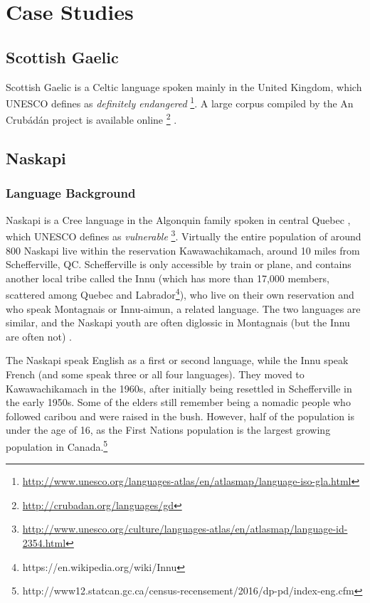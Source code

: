 \section{Case Studies}\label{sec:case-studies}
\subsection{Scottish Gaelic}

Scottish Gaelic is a Celtic language spoken mainly in the United Kingdom, which UNESCO defines as {\it definitely endangered} \footnote{\href{http://www.unesco.org/languages-atlas/en/atlasmap/language-iso-gla.html}{http://www.unesco.org/languages-atlas/en/atlasmap/language-iso-gla.html}}. A large corpus compiled by the An Crub\'ad\'an project is available online \footnote{\href{http://crubadan.org/languages/gd}{http://crubadan.org/languages/gd}} \cite{scannell2007crubadan}.

\subsection{Naskapi}

\subsubsection{Language Background}

Naskapi is a Cree language in the Algonquin family spoken in central Quebec \cite{MacKenzie-and-Jancewicz-1994}, which UNESCO defines as {\it vulnerable} \footnote{\href{http://www.unesco.org/culture/languages-atlas/en/atlasmap/language-id-2354.html}{http://www.unesco.org/culture/languages-atlas/en/atlasmap/language-id-2354.html}}. Virtually the entire population of around 800 Naskapi live within the reservation Kawawachikamach, around 10 miles from Schefferville, QC. Schefferville is only accessible by train or plane, and contains another local tribe called the Innu (which has more than 17,000 members, scattered among Quebec and Labrador\footnote{https://en.wikipedia.org/wiki/Innu}), who live on their own reservation and who speak Montagnais or Innu-aimun, a related language. The two languages are similar, and the Naskapi youth are often diglossic in Montagnais (but the Innu are often not) \cite{MacKenzie-1980}.

The Naskapi speak English as a first or second language, while the Innu speak French (and some speak three or all four languages). They moved to Kawawachikamach in the 1960s, after initially being resettled in Schefferville in the early 1950s. Some of the elders still remember being a nomadic people who followed caribou and were raised in the bush. However, half of the population is under the age of 16, as the First Nations population is the largest growing population in Canada.\footnote{http://www12.statcan.gc.ca/census-recensement/2016/dp-pd/index-eng.cfm}

